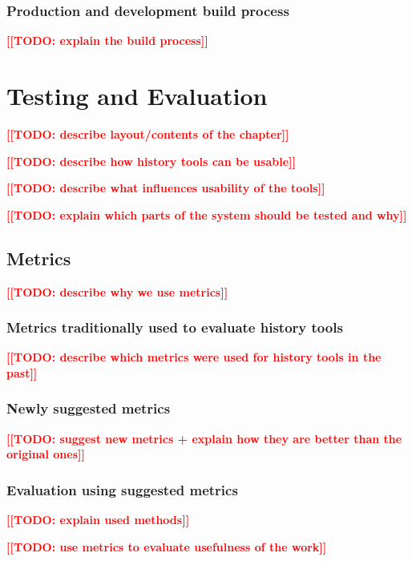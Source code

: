 \documentclass[thesis=M,english]{FITthesis}[2012/10/20]
\newcommand{\blind}[1][1]{}
\newcommand{\todotext}[1]{\textcolor{red}{\textbf{[[#1]]}}}
\begin{document}
\blind

\subsection{Production and development build process}
\todotext{TODO: explain the build process}

\blind[2]


\chapter{Testing and Evaluation}

\todotext{TODO: describe layout/contents of the chapter}

\todotext{TODO: describe how history tools can be usable}

\todotext{TODO: describe what influences usability of the tools}

\todotext{TODO: explain which parts of the system should be tested and why}

\blind[3]

\section{Metrics}

\todotext{TODO: describe why we use metrics}

\subsection{Metrics traditionally used to evaluate history tools}

\todotext{TODO: describe which metrics were used for history tools in the past}

\subsection{Newly suggested metrics}

\todotext{TODO: suggest new metrics + explain how they are better than the original ones}

\subsection{Evaluation using suggested metrics}

\todotext{TODO: explain used methods}

\todotext{TODO: use metrics to evaluate usefulness of the work}
\end{document}
